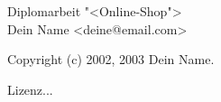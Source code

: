 %
%

\begin{titlepage}
	\vspace*{7cm}
	\begin{center}
		\Huge
		Diplomarbeit "<Online-Shop">\\
		\vspace{2cm}
		Dein Name <deine@email.com>\\
	\end{center}
	\normalsize
	\vfill
	Copyright (c)  2002, 2003  Dein Name.

	Lizenz...	
\end{titlepage}

\tableofcontents

\listoffigures

\listoftables

%
%